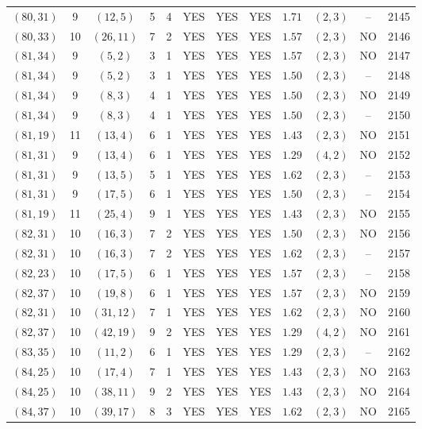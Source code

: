 \begin{longtable}{|c|c|c|c|c|c|c|c|c|c|c|c|}
$(80,31)$ & 9 & $(12,5)$ & 5 & 4 & YES & YES & YES & $1.71$ & $(2,3)$ & -- & 2145\\
$(80,33)$ & 10 & $(26,11)$ & 7 & 2 & YES & YES & YES & $1.57$ & $(2,3)$ & NO & 2146\\
$(81,34)$ & 9 & $(5,2)$ & 3 & 1 & YES & YES & YES & $1.57$ & $(2,3)$ & NO & 2147\\
$(81,34)$ & 9 & $(5,2)$ & 3 & 1 & YES & YES & YES & $1.50$ & $(2,3)$ & -- & 2148\\
$(81,34)$ & 9 & $(8,3)$ & 4 & 1 & YES & YES & YES & $1.50$ & $(2,3)$ & NO & 2149\\
$(81,34)$ & 9 & $(8,3)$ & 4 & 1 & YES & YES & YES & $1.50$ & $(2,3)$ & -- & 2150\\
$(81,19)$ & 11 & $(13,4)$ & 6 & 1 & YES & YES & YES & $1.43$ & $(2,3)$ & NO & 2151\\
$(81,31)$ & 9 & $(13,4)$ & 6 & 1 & YES & YES & YES & $1.29$ & $(4,2)$ & NO & 2152\\
$(81,31)$ & 9 & $(13,5)$ & 5 & 1 & YES & YES & YES & $1.62$ & $(2,3)$ & -- & 2153\\
$(81,31)$ & 9 & $(17,5)$ & 6 & 1 & YES & YES & YES & $1.50$ & $(2,3)$ & -- & 2154\\
$(81,19)$ & 11 & $(25,4)$ & 9 & 1 & YES & YES & YES & $1.43$ & $(2,3)$ & NO & 2155\\
$(82,31)$ & 10 & $(16,3)$ & 7 & 2 & YES & YES & YES & $1.50$ & $(2,3)$ & NO & 2156\\
$(82,31)$ & 10 & $(16,3)$ & 7 & 2 & YES & YES & YES & $1.62$ & $(2,3)$ & -- & 2157\\
$(82,23)$ & 10 & $(17,5)$ & 6 & 1 & YES & YES & YES & $1.57$ & $(2,3)$ & -- & 2158\\
$(82,37)$ & 10 & $(19,8)$ & 6 & 1 & YES & YES & YES & $1.57$ & $(2,3)$ & NO & 2159\\
$(82,31)$ & 10 & $(31,12)$ & 7 & 1 & YES & YES & YES & $1.62$ & $(2,3)$ & NO & 2160\\
$(82,37)$ & 10 & $(42,19)$ & 9 & 2 & YES & YES & YES & $1.29$ & $(4,2)$ & NO & 2161\\
$(83,35)$ & 10 & $(11,2)$ & 6 & 1 & YES & YES & YES & $1.29$ & $(2,3)$ & -- & 2162\\
$(84,25)$ & 10 & $(17,4)$ & 7 & 1 & YES & YES & YES & $1.43$ & $(2,3)$ & NO & 2163\\
$(84,25)$ & 10 & $(38,11)$ & 9 & 2 & YES & YES & YES & $1.43$ & $(2,3)$ & NO & 2164\\
$(84,37)$ & 10 & $(39,17)$ & 8 & 3 & YES & YES & YES & $1.62$ & $(2,3)$ & NO & 2165\\

\end{longtable}
